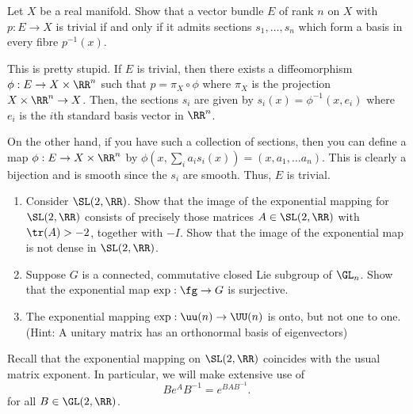 \documentclass[11pt, headheight=30pt]{scrartcl}
\begin{document}
\pagebreak
\begin{prob*}
    Let $X$ be a real manifold. Show that a vector bundle $E$ of rank $n$ on $X$ with
    $p:E\to X$ is trivial if and only if it admits sections $s_1,\ldots,s_n$ which form a
    basis in every fibre $p^{-1}(x)$.
\end{prob*}

This is pretty stupid. If $E$ is trivial, then there exists a diffeomorphism
$\phi: E \to X\times \RR^n$ such that $p = \pi_X\circ \phi$ where $\pi_X$ is the
projection $X\times \RR^n\to X$. Then, the sections $s_i$ are given by
$s_i(x) = \phi^{-1}(x, e_i)$ where $e_i$ is
the $i$th standard basis vector in $\RR^n$.

On the other hand, if you have such a collection of sections, then you can
define a map $\phi: E \to X\times \RR^n$ by
$\phi(x, \sum_i a_i s_i(x)) = (x, a_1, \dots a_n)$. This is clearly a bijection
and is smooth since the $s_i$ are smooth. Thus, $E$ is trivial.

\pagebreak
\begin{prob*}\phantom{A}
    \begin{enumerate}
        \item Consider $\SL(2,\RR)$. Show that the image of the exponential mapping for
            $\SL(2,\RR)$ consists of precisely those matrices $A\in\SL(2,\RR)$ with
            $\tr(A)>-2$, together with $-I$. Show that the image of the exponential map
            is not dense in $\SL(2,\RR)$.
        \item Suppose $G$ is a connected, commutative closed Lie subgroup of $\GL_n$.
            Show that the exponential map $\exp:\fg\to G$ is surjective.
        \item The exponential mapping $\exp:\uu(n)\to\UU(n)$ is onto, but not one to one.
            (Hint: A unitary matrix has an orthonormal basis of eigenvectors)
    \end{enumerate}
\end{prob*}

\begin{psec*}
    [Part 1]
\end{psec*}
Recall that the exponential mapping on $\SL(2,\RR)$ coincides with the usual
matrix exponent. In particular, we will make extensive use of
\[
    Be^AB^{-1} = e^{BAB^{-1}}.    
\]
for all $B\in \GL(2,\RR)$.
\end{document}
